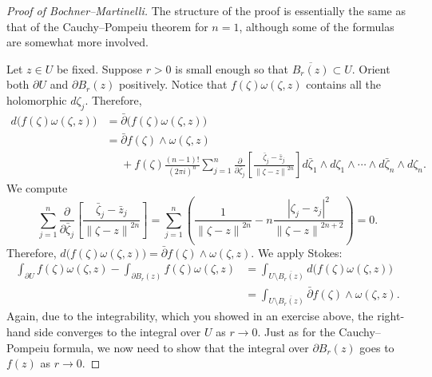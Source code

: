 \documentclass[12pt,openany]{book}
\newcommand{\abs}[1]{\left\lvert {#1} \right\rvert}
\newcommand{\norm}[1]{\left\lVert {#1} \right\rVert}
\theoremstyle{plain}
\theoremstyle{remark}
\theoremstyle{definition}
\theoremstyle{exercise}
\theoremstyle{example}
\begin{document}
\begin{proof}[Proof of Bochner--Martinelli]
The structure of the proof is essentially the same as that of
the Cauchy--Pompeiu theorem for $n=1$, although some of the formulas are somewhat
more involved.

Let $z \in U$ be fixed.  Suppose $r > 0$ is small enough so that
$\overline{B_r(z)} \subset U$.  Orient both
$\partial U$ and $\partial B_r(z)$
positively.  Notice that 
$f(\zeta) \omega(\zeta,z)$ contains all the holomorphic $d\zeta_j$.
Therefore,
\begin{equation*}
\begin{split}
d \bigl( f(\zeta) \omega(\zeta,z) \bigr)
& =
\bar{\partial} \bigl( f(\zeta) \omega(\zeta,z) \bigr)
\\
& = 
\bar{\partial} f(\zeta) \wedge \omega(\zeta,z)
\\
& \phantom{=} +
f(\zeta)
\frac{(n-1)!}{{(2\pi i)}^n}
\sum_{j=1}^n
\frac{\partial}{\partial \bar{\zeta}_j} \left[
\frac{\bar{\zeta}_j-\bar{z}_j}{\norm{\zeta-z}^{2n}}
\right]
d\bar{\zeta}_1 \wedge d\zeta_1 \wedge
\cdots \wedge
d\bar{\zeta}_n \wedge d\zeta_n .
\end{split}
\end{equation*}
We compute
\begin{equation*}
\sum_{j=1}^n
\frac{\partial}{\partial \bar{\zeta}_j}
\left[
\frac{\bar{\zeta}_j-\bar{z}_j}{\norm{\zeta-z}^{2n}}
\right]
=
\sum_{j=1}^n
\left(
\frac{1}{\norm{\zeta-z}^{2n}}
-n
\frac{\abs{\zeta_j-z_j}^2}{\norm{\zeta-z}^{2n+2}}
\right)
= 0 .
\end{equation*}
Therefore,
$d \bigl( f(\zeta) \omega(\zeta,z) \bigr) = \bar{\partial} f(\zeta) \wedge
\omega(\zeta,z)$.
We apply Stokes:
\begin{equation*}
\begin{split}
\int_{\partial U}
f(\zeta) \omega(\zeta,z)
-
\int_{\partial B_r(z)}
f(\zeta) \omega(\zeta,z)
& =
\int_{U \setminus \overline{B_r(z)}}
d \bigl( f(\zeta) \omega(\zeta,z) \bigr)
\\
& =
\int_{U \setminus \overline{B_r(z)}}
\bar{\partial} f(\zeta) \wedge \omega(\zeta,z) .
\end{split}
\end{equation*}
Again, due to the integrability, which you showed in an exercise above,
the right-hand side converges to the integral over $U$ as $r \to 0$.
Just as for the Cauchy--Pompeiu formula, we now need to show that the integral
over $\partial B_r(z)$ goes to $f(z)$ as $r \to 0$.


\end{proof}
\end{document}
